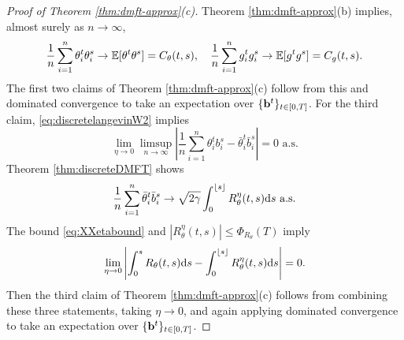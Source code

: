 \begin{proof}[Proof of Theorem \ref{thm:dmft-approx}(c)]
Theorem \ref{thm:dmft-approx}(b) implies, almost surely as $n \to \infty$,
\[\frac{1}{n}\sum_{i=1}^n \theta_i^t\theta_i^s \to
\mathbb{E}[\theta^t \theta^s]=C_\theta(t,s),
\quad \frac{1}{n}\sum_{i=1}^n g_i^tg_i^s \to
\mathbb{E}[g^tg^s]=C_g(t,s).\]
The first two claims of Theorem \ref{thm:dmft-approx}(c) follow from this and
dominated convergence to take an expectation over $\{\mathbf{b}^t\}_{t \in [0,T]}$. For
the third claim, \eqref{eq:discretelangevinW2} implies
\[\lim_{\eta \to 0}
\limsup_{n \to \infty} \left|\frac{1}{n}\sum_{i=1}^n \theta_i^t b_i^s
-\bar\theta_i^t \bar b_i^s\right|=0 \text{ a.s.}\]
Theorem \ref{thm:discreteDMFT} shows
\[\frac{1}{n}\sum_{i=1}^n \bar\theta_i^t \bar b_i^s
\to \sqrt{2\gamma}\int_0^{\lfloor s \rfloor} R_\theta^\eta(t,s) \mathrm{d} s \text{ a.s.}\]
The bound \eqref{eq:XXetabound} and $|R_\theta^\eta(t,s)| \leq
\Phi_{R_\theta}(T)$ imply
\[\lim_{\eta \to 0}\left|\int_0^s R_\theta(t,s) \mathrm{d} s 
-\int_0^{\lfloor s \rfloor} R_\theta^\eta(t,s) \mathrm{d} s\right|=0.\]
Then the third claim of Theorem \ref{thm:dmft-approx}(c) follows from combining
these three statements, taking $\eta \to 0$, and again applying dominated
convergence to take an expectation over $\{\mathbf{b}^t\}_{t \in [0,T]}$.
\end{proof}
